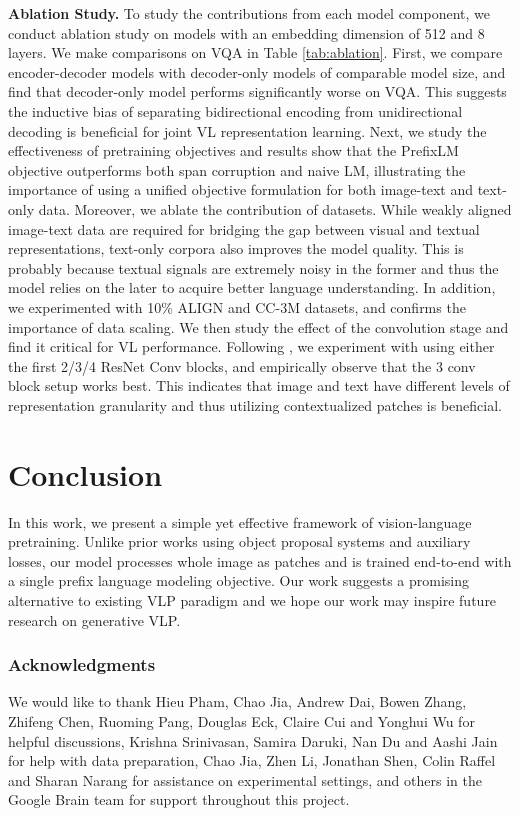 \documentclass{article} \usepackage{iclr2022_conference,times}
\begin{document}
\textbf{Ablation Study.}
To study the contributions from each model component, we conduct ablation study on  models with an embedding dimension of 512 and 8 layers. We make comparisons on VQA in Table \ref{tab:ablation}. 
First, we compare encoder-decoder models with decoder-only models of comparable model size, and find that decoder-only model performs significantly worse on VQA. 
This suggests the inductive bias of separating bidirectional encoding from unidirectional decoding is beneficial for joint VL representation learning.
Next, we study the effectiveness of pretraining objectives and results show that the PrefixLM objective outperforms both span corruption \citep{raffel2019exploring} and naive LM,
illustrating the importance of using a unified objective formulation for both image-text and text-only data.
Moreover, we ablate the contribution of datasets.
While weakly aligned image-text data are required for bridging the gap between visual and textual representations, text-only corpora also improves the model quality. 
This is probably because textual signals are extremely noisy in the former and thus the model relies on the later to acquire better language understanding.
In addition, we experimented with 10\% ALIGN and CC-3M \citep{sharma-etal-2018-conceptual} datasets, and confirms the importance of data scaling.
We then study the effect of the convolution stage and find it critical for VL performance. 
Following \cite{dai2021coatnet},
we experiment with using either the first 2/3/4 ResNet Conv blocks,
and empirically observe that the 3 conv block setup works best.
This indicates that image and text have different levels of representation granularity and thus utilizing contextualized patches is beneficial.


\section{Conclusion}
In this work, we present a simple yet effective framework of vision-language pretraining. Unlike prior works using object proposal systems and auxiliary losses,
our model processes whole image as patches and is trained end-to-end with a single prefix language modeling objective.
Our work suggests a promising alternative to existing VLP paradigm and we hope our work may inspire future research on generative VLP.



\subsubsection*{Acknowledgments}
We would like to thank Hieu Pham, Chao Jia, Andrew Dai, Bowen Zhang, Zhifeng Chen, Ruoming Pang, Douglas Eck, Claire Cui and Yonghui Wu for helpful discussions,
Krishna Srinivasan, Samira Daruki, Nan Du and Aashi Jain for help with data preparation,
Chao Jia, Zhen Li, Jonathan Shen, Colin Raffel and Sharan Narang for assistance on experimental settings,
and others in the Google Brain team for support throughout this project.
\end{document}
